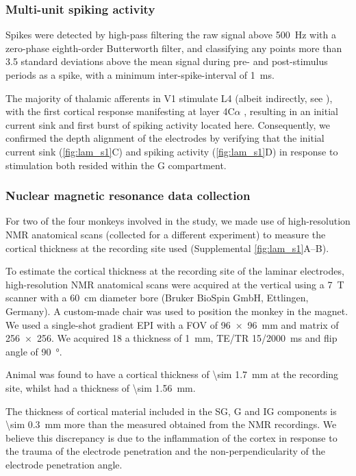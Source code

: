 \subsubsection{Multi-unit spiking activity}

Spikes were detected by high-pass filtering the raw signal above \SI{500}{Hz} with a zero-phase eighth-order Butterworth filter, and classifying any points more than 3.5 standard deviations above the mean signal during pre- and post-stimulus periods as a spike, with a minimum inter-spike-interval of \SI{1}{\milli\second}.

The majority of thalamic afferents in \ac{V1} stimulate \ac{L4} (albeit indirectly, see \citealp{Hansen2012}), with the first cortical response manifesting at layer 4C$\alpha$ \citep{Callaway1998}, resulting in an initial current sink and first burst of spiking activity located here.
Consequently, we confirmed the depth alignment of the electrodes by verifying that the initial current sink (\autoref{fig:lam_s1}C) and spiking activity (\autoref{fig:lam_s1}D) in response to stimulation both resided within the \ac{G} compartment.

\subsubsection{Nuclear magnetic resonance data collection}

For two of the four monkeys involved in the study, we made use of high-resolution \ac{NMR} anatomical scans (collected for a different experiment) to measure the cortical thickness at the recording site used (Supplemental \autoref{fig:lam_s1}A--B).

To estimate the cortical thickness at the recording site of the laminar electrodes, high-resolution \ac{NMR} anatomical scans were acquired at the vertical using a \SI{7}{T} scanner with a \SI{60}{\centi\metre} diameter bore (Bruker BioSpin GmbH, Ettlingen, Germany).
A custom-made chair was used to position the monkey in the magnet.
We used a single-shot gradient \ac{EPI} with a \ac{FOV} of \SI{96x96}{\milli\metre} and matrix of \num{256x256}.
We acquired 18 a thickness of \SI{1}{\milli\metre}, TE/TR 15/\SI{2000}{\milli\second} and flip angle of \SI{90}{\degree}.

Animal  was found to have a cortical thickness of \SI{\sim 1.7}{mm} at the recording site, whilst  had a thickness of \SI{\sim 1.56}{mm}.

The thickness of cortical material included in the \ac{SG}, \ac{G} and \ac{IG} components is \SI{\sim 0.3}{mm} more than the measured obtained from the \ac{NMR} recordings.
We believe this discrepancy is due to the inflammation of the cortex in response to the trauma of the electrode penetration and the non-perpendicularity of the electrode penetration angle.



